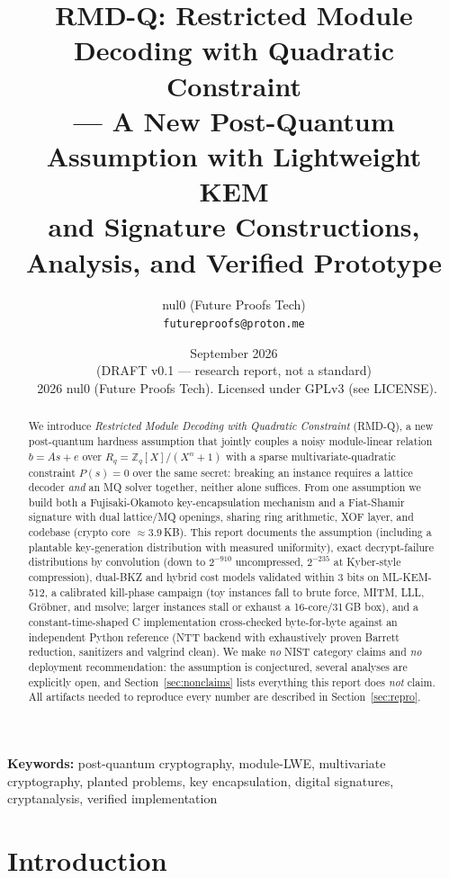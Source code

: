 \documentclass[11pt,a4paper]{article}
\title{RMD-Q: Restricted Module Decoding with Quadratic Constraint\\--- A New Post-Quantum Assumption with Lightweight KEM\\and Signature Constructions, Analysis, and Verified Prototype}
\author{nul0 (Future Proofs Tech) \\ \texttt{futureproofs@proton.me}}
\date{September 2026 \\ (DRAFT v0.1 --- research report, not a standard) \\
\small \textcopyright\ 2026 nul0 (Future Proofs Tech). Licensed under GPLv3 (see LICENSE).}
\begin{document}
\maketitle

\begin{abstract}
We introduce \emph{Restricted Module Decoding with Quadratic Constraint}
(RMD-Q), a new post-quantum hardness assumption that jointly couples a
noisy module-linear relation $b = As+e$ over $R_q = \mathbb{Z}_q[X]/(X^n+1)$
with a sparse multivariate-quadratic constraint $P(s)=0$ over the same
secret: breaking an instance requires a lattice decoder \emph{and} an MQ
solver together, neither alone suffices.  From one assumption we build both
a Fujisaki-Okamoto key-encapsulation mechanism and a Fiat-Shamir signature
with dual lattice/MQ openings, sharing ring arithmetic, XOF layer, and
codebase (crypto core $\approx 3.9$\,KB).  This report documents the
assumption (including a plantable key-generation distribution with measured
uniformity), exact decrypt-failure distributions by convolution (down to
$2^{-910}$ uncompressed, $2^{-235}$ at Kyber-style compression), dual-BKZ
and hybrid cost models validated within 3 bits on ML-KEM-512, a calibrated
kill-phase campaign (toy instances fall to brute force, MITM, LLL,
Gr\"obner, and msolve; larger instances stall or exhaust a 16-core/31\,GB
box), and a constant-time-shaped C implementation cross-checked
byte-for-byte against an independent Python reference (NTT backend with
exhaustively proven Barrett reduction, sanitizers and valgrind clean).
We make \emph{no} NIST category claims and \emph{no} deployment
recommendation: the assumption is conjectured, several analyses are
explicitly open, and Section~\ref{sec:nonclaims} lists everything this
report does \emph{not} claim.  All artifacts needed to reproduce every
number are described in Section~\ref{sec:repro}.
\end{abstract}

\noindent\textbf{Keywords:} post-quantum cryptography, module-LWE,
multivariate cryptography, planted problems, key encapsulation, digital
signatures, cryptanalysis, verified implementation

\tableofcontents
\newpage

\section{Introduction}
\end{document}
